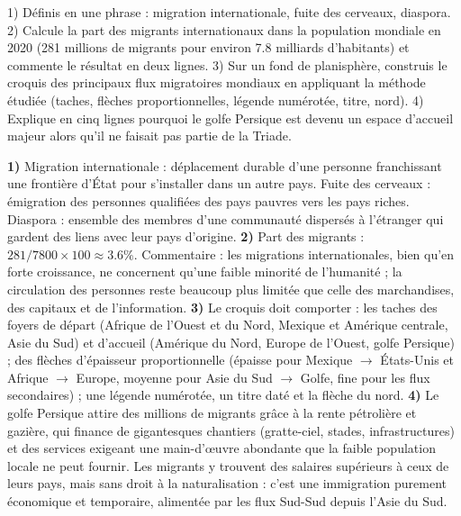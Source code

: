\documentclass[11pt]{article}
\begin{document}
\begin{exercice}
1) Définis en une phrase : migration internationale, fuite des cerveaux, diaspora. 2) Calcule la part des migrants internationaux dans la population mondiale en 2020 (281 millions de migrants pour environ \num{7,8} milliards d'habitants) et commente le résultat en deux lignes. 3) Sur un fond de planisphère, construis le croquis des principaux flux migratoires mondiaux en appliquant la méthode étudiée (taches, flèches proportionnelles, légende numérotée, titre, nord). 4) Explique en cinq lignes pourquoi le golfe Persique est devenu un espace d'accueil majeur alors qu'il ne faisait pas partie de la Triade.
\end{exercice}

\begin{corrige}
\textbf{1)} Migration internationale : déplacement durable d'une personne franchissant une frontière d'État pour s'installer dans un autre pays. Fuite des cerveaux : émigration des personnes qualifiées des pays pauvres vers les pays riches. Diaspora : ensemble des membres d'une communauté dispersés à l'étranger qui gardent des liens avec leur pays d'origine.
\textbf{2)} Part des migrants : $281 / 7800 \times 100 \approx \num{3,6} \%$. Commentaire : les migrations internationales, bien qu'en forte croissance, ne concernent qu'une faible minorité de l'humanité ; la circulation des personnes reste beaucoup plus limitée que celle des marchandises, des capitaux et de l'information.
\textbf{3)} Le croquis doit comporter : les taches des foyers de départ (Afrique de l'Ouest et du Nord, Mexique et Amérique centrale, Asie du Sud) et d'accueil (Amérique du Nord, Europe de l'Ouest, golfe Persique) ; des flèches d'épaisseur proportionnelle (épaisse pour Mexique $\rightarrow$ États-Unis et Afrique $\rightarrow$ Europe, moyenne pour Asie du Sud $\rightarrow$ Golfe, fine pour les flux secondaires) ; une légende numérotée, un titre daté et la flèche du nord.
\textbf{4)} Le golfe Persique attire des millions de migrants grâce à la rente pétrolière et gazière, qui finance de gigantesques chantiers (gratte-ciel, stades, infrastructures) et des services exigeant une main-d'œuvre abondante que la faible population locale ne peut fournir. Les migrants y trouvent des salaires supérieurs à ceux de leurs pays, mais sans droit à la naturalisation : c'est une immigration purement économique et temporaire, alimentée par les flux Sud-Sud depuis l'Asie du Sud.
\end{corrige}
\end{document}
